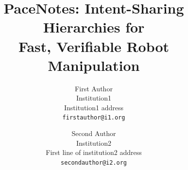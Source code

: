 \documentclass[10pt,twocolumn,letterpaper]{article}
\title{PaceNotes: Intent-Sharing Hierarchies for\\Fast, Verifiable Robot Manipulation}
\author{First Author\\
Institution1\\
Institution1 address\\
{\tt\small firstauthor@i1.org}
\and
Second Author\\
Institution2\\
First line of institution2 address\\
{\tt\small secondauthor@i2.org}
}
\begin{document}
\maketitle

    







{
    \small
    
    
}


\end{document}
